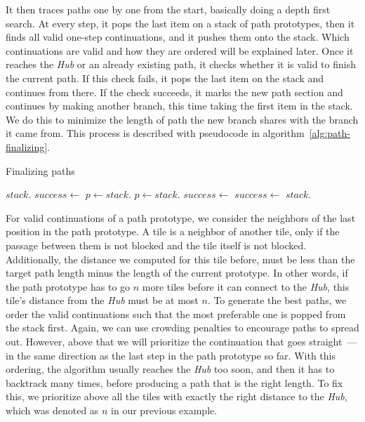 It then traces paths one by one from the start, basically doing a depth first search.
At every step, it pops the last item on a stack of path prototypes, then it finds all valid one-step continuations, and it pushes them onto the stack.
Which continuations are valid and how they are ordered will be explained later.
Once it reaches the \emph{Hub} or an already existing path, it checks whether it is valid to finish the current path.
If this check fails, it pops the last item on the stack and continues from there.
If the check succeeds, it marks the new path section and continues by making another branch, this time taking the first item in the stack.
We do this to minimize the length of path the new branch shares with the branch it came from.
This process is described with pseudocode in algorithm~\ref{alg:path-finalizing}.

\begin{algorithm}[H]
    \caption{Finalizing paths}
    \label{alg:path-finalizing}
    \begin{algorithmic}[0]
        \State $stack$.
        \State $success \gets$ 
        \Statex
        \State $p \gets stack$.
        \Else
        \State $p \gets stack$.
        \EndIf
        \Statex
        \State $success \gets$ 
        \Else
        \State $success \gets$ 
        \State $stack$.
        \EndFor
        \EndIf
        \EndWhile
        \EndFor
        \Statex
    \end{algorithmic}
\end{algorithm}

For valid continuations of a path prototype, we consider the neighbors of the last position in the path prototype.
A tile is a neighbor of another tile, only if the passage between them is not blocked and the tile itself is not blocked.
Additionally, the distance we computed for this tile before, must be less than the target path length minus the length of the current prototype.
In other words, if the path prototype has to go $n$ more tiles before it can connect to the \emph{Hub}, this tile's distance from the \emph{Hub} must be at most $n$.
To generate the best paths, we order the valid continuations such that the most preferable one is popped from the stack first.
Again, we can use crowding penalties to encourage paths to spread out.
However, above that we will prioritize the continuation that goes straight~--- in the same direction as the last step in the path prototype so far.
With this ordering, the algorithm usually reaches the \emph{Hub} too soon, and then it has to backtrack many times, before producing a path that is the right length.
To fix this, we prioritize above all the tiles with exactly the right distance to the \emph{Hub}, which was denoted as $n$ in our previous example.

